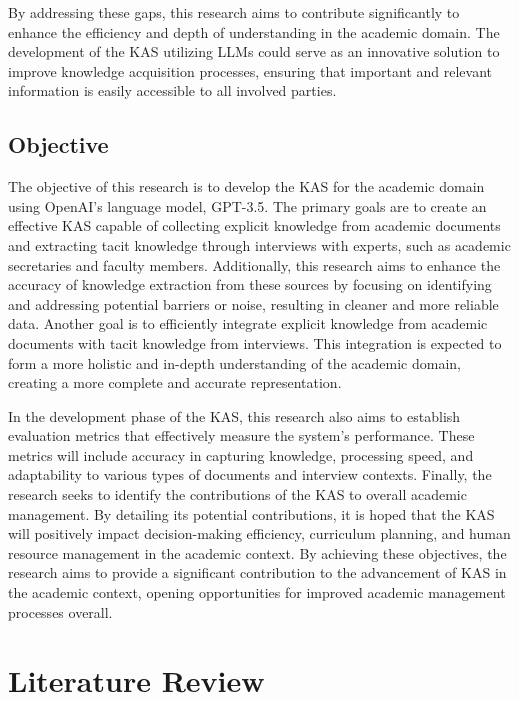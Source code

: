 \documentclass[runningheads]{llncs}
\begin{document}
By addressing these gaps, this research aims to contribute significantly to enhance the efficiency and depth of understanding in the academic domain. The development of the KAS utilizing LLMs could serve as an innovative solution to improve knowledge acquisition processes, ensuring that important and relevant information is easily accessible to all involved parties.

\subsection{Objective}
The objective of this research is to develop the KAS for the academic domain using OpenAI's language model, GPT-3.5. The primary goals are to create an effective KAS capable of collecting explicit knowledge from academic documents and extracting tacit knowledge through interviews with experts, such as academic secretaries and faculty members. Additionally, this research aims to enhance the accuracy of knowledge extraction from these sources by focusing on identifying and addressing potential barriers or noise, resulting in cleaner and more reliable data. Another goal is to efficiently integrate explicit knowledge from academic documents with tacit knowledge from interviews. This integration is expected to form a more holistic and in-depth understanding of the academic domain, creating a more complete and accurate representation.

In the development phase of the KAS, this research also aims to establish evaluation metrics that effectively measure the system's performance. These metrics will include accuracy in capturing knowledge, processing speed, and adaptability to various types of documents and interview contexts. Finally, the research seeks to identify the contributions of the KAS to overall academic management. By detailing its potential contributions, it is hoped that the KAS will positively impact decision-making efficiency, curriculum planning, and human resource management in the academic context. By achieving these objectives, the research aims to provide a significant contribution to the advancement of KAS in the academic context, opening opportunities for improved academic management processes overall.

\section{Literature Review}
\end{document}
